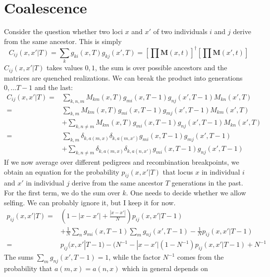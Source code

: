 \documentclass{article}
\begin{document}
\section*{Coalescence}
Consider the question whether two loci $x$ and $x'$ of two individuals $i$ and
$j$ derive from the same ancestor. This is simply
\begin{equation}
  C_{ij}(x,x'|T) = \sum_k g_{ki}(x,T)g_{kj}(x',T) = \left[\prod \mathbf{M}(x,t)\right]^{\dagger}\left[\prod \mathbf{M}(x',t)\right]
\end{equation}
$C_{ij}(x,x'|T)$ takes values $0,1$, the sum is over possible
ancestors and the matrices are quenched realizations. We can break the
product into generations $0,\ldots T-1$ and the last:
\begin{equation}
  \begin{split}
  C_{ij}(x,x'|T) = &\sum_{k,n,m} M_{km}(x,T)
  g_{mi}(x,T-1)g_{nj}(x',T-1)M_{kn}(x',T)\\ 
  = &\sum_{k,m} M_{km}(x,T) g_{mi}(x,T-1)g_{mj}(x',T-1)M_{km}(x',T)\\
  &+ \sum_{k,n\neq
    m}M_{km}(x,T)g_{mi}(x,T-1)g_{nj}(x',T-1)M_{kn}(x',T)\\
= &\sum_{k,m} \delta_{k, a(m,x)}\delta_{k, a(m,x')} g_{mi}(x,T-1)g_{mj}(x',T-1)\\
  &+ \sum_{k,n\neq
    m}\delta_{k, a(m,x)} \delta_{k, a(n,x')} g_{mi}(x,T-1)g_{nj}(x',T-1)
  \end{split}
\end{equation}
If we now average over different pedigrees and recombination
breakpoints, we obtain an equation for the probability
$p_{ij}(x,x'|T)$ that locus $x$ in individual $i$ and $x'$ in
individual $j$ derive from the same ancestor $T$ generations in the
past. For the first term, we do the sum over $k$. One needs to decide
whether we allow selfing. We can probably ignore it, but I keep it for
now. 
\begin{equation}
  \begin{split}
   p_{ij}(x,x'|T) =& (1-|x-x'| + \frac{|x-x'|}{N})p_{ij}(x,x'|T-1)\\
   & + \frac{1}{N}\sum_{n} g_{mi}(x,T-1)\sum_{m} g_{nj}(x',T-1) -
  \frac{1}{N}p_{ij}(x,x'|T-1)\\
=& p_{ij}(x,x'|T-1) -(N^{-1} - |x-x'|(1-N^{-1}) p_{ij}(x,x'|T-1) +N^{-1}
  \end{split}
\end{equation}
The sums $\sum_{m} g_{nj}(x',T-1)=1$, while the factor $N^{-1}$ comes
from the probability that $a(m,x)=a(n,x)$ which in general depends on
\end{document}
